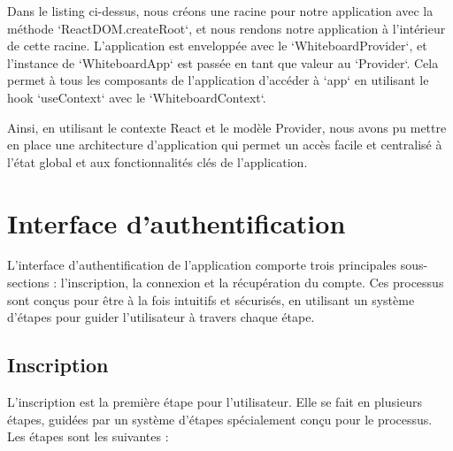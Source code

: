 Dans le listing ci-dessus, nous créons une racine pour notre application avec la méthode `ReactDOM.createRoot`, et nous rendons notre application à l'intérieur de cette racine. L'application est enveloppée avec le `WhiteboardProvider`, et l'instance de `WhiteboardApp` est passée en tant que valeur au `Provider`. Cela permet à tous les composants de l'application d'accéder à `app` en utilisant le hook `useContext` avec le `WhiteboardContext`.

Ainsi, en utilisant le contexte React et le modèle Provider, nous avons pu mettre en place une architecture d'application qui permet un accès facile et centralisé à l'état global et aux fonctionnalités clés de l'application.

\section{Interface d'authentification}

L'interface d'authentification de l'application comporte trois principales sous-sections : l'inscription, la connexion et la récupération du compte. Ces processus sont conçus pour être à la fois intuitifs et sécurisés, en utilisant un système d'étapes pour guider l'utilisateur à travers chaque étape.

\subsection{Inscription}

L'inscription est la première étape pour l'utilisateur. Elle se fait en plusieurs étapes, guidées par un système d'étapes spécialement conçu pour le processus. Les étapes sont les suivantes :

